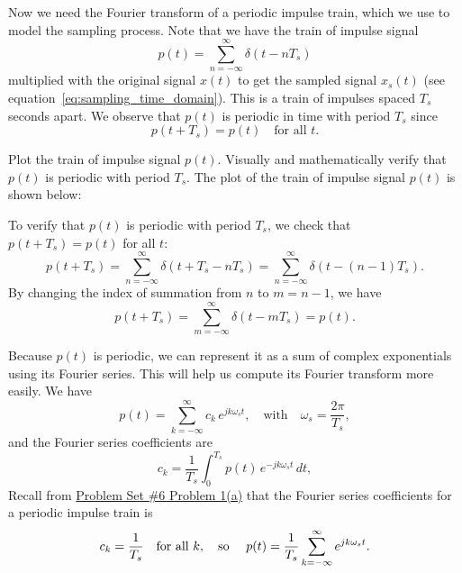 Now we need the Fourier transform of a periodic impulse train, which we use to model the sampling process. Note that we have the train of impulse signal 
\[
p(t) = \sum_{n=-\infty}^{\infty} \delta(t - nT_s)
\]
multiplied with the original signal $x(t)$ to get the sampled signal $x_s(t)$ (see equation~\eqref{eq:sampling_time_domain}). This is a train of impulses spaced $T_s$ seconds apart. We observe that $p(t)$ is
periodic in time with period $T_s$ since
\[
p(t + T_s) = p(t) \quad \text{for all } t.
\]
\begin{popquiz}
    Plot the train of impulse signal $p(t)$. Visually and mathematically verify that $p(t)$ is periodic with period $T_s$.
    \popqsplit
    The plot of the train of impulse signal $p(t)$ is shown below:
    \begin{center}
    \end{center}

    To verify that $p(t)$ is periodic with period $T_s$, we check that $p(t + T_s) = p(t)$ for all $t$:
    \[
    p(t + T_s) = \sum_{n=-\infty}^{\infty} \delta(t + T_s - nT_s) = \sum_{n=-\infty}^{\infty} \delta(t - (n-1)T_s).
    \]
    By changing the index of summation from $n$ to $m = n - 1$, we have
    \[
    p(t + T_s) = \sum_{m=-\infty}^{\infty} \delta(t - mT_s) = p(t).
    \]
\end{popquiz}
Because $p(t)$ is periodic, we can represent it as a sum of complex exponentials using its Fourier series. This will help us compute its Fourier transform more easily. We have 
\[
p(t) = \sum_{k=-\infty}^{\infty} c_k\,e^{jk\omega_s t},
\quad \text{with} \quad
\omega_s = \frac{2\pi}{T_s},
\]
and the Fourier series coefficients are
\[
c_k = \frac{1}{T_s} \int_{0}^{T_s} p(t)\,e^{-jk\omega_s t}\,dt,
\]
Recall from \href{https://github.com/ee-ucmerced/ee102-signals-systems/blob/main/problem_sets/pset6/pset6.pdf}{Problem Set \#6 Problem 1(a)} that the Fourier series coefficients for a periodic impulse train is
\[
c_k = \frac{1}{T_s} \quad \text{for all } k, \quad \text{so \quad }
p(t) = \frac{1}{T_s} \sum_{k=-\infty}^{\infty} e^{jk\omega_s t}.
\]

